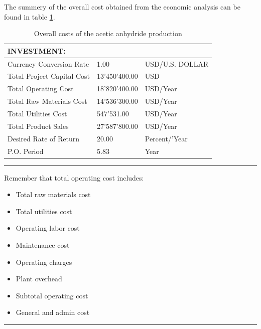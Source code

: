 \begin{enumerate}[label=\textbf{Step \arabic{enumi}}:,ref=Step \arabic{enumi}]
	The summery of the overall cost obtained from the economic analysis can be found in table \ref{tab:AceticProdInvestment}.
	
	\begin{table}[H]
		\centering
		\begin{tabular}{l|ll}
			INVESTMENT:                &  \\ \hline
			Currency Conversion Rate   & 1.00                                               & USD/U.S. DOLLAR                                        \\
			Total Project Capital Cost & 13'450'400.00                                        & USD                                                    \\
			Total Operating Cost       & 18'820'400.00                                        & USD/Year                                               \\
			Total Raw Materials Cost   & 14'536'300.00                                        & USD/Year                                               \\
			Total Utilities Cost       & 547'531.00                                          & USD/Year                                               \\
			Total Product Sales        & 27'587'800.00                                        & USD/Year                                               \\
			Desired Rate of Return     & 20.00                                              & Percent/'Year                                          \\
			P.O. Period                & 5.83                                               & Year            \\ \hline                                      
		\end{tabular}
	\caption{Overall costs of the acetic anhydride production}
	\label{tab:AceticProdInvestment}
	\end{table}

	\hrule
	Remember that total operating cost includes:
	
	\begin{multicols}{2}
		\begin{itemize}
			\item Total raw materials cost
			\item Total utilities cost
			\item Operating labor cost
			\item Maintenance cost
			\item Operating charges
			\item Plant overhead
			\item Subtotal operating cost
			\item General and admin cost
		\end{itemize} 
	\end{multicols}
	\hrule 
	

\end{enumerate}
